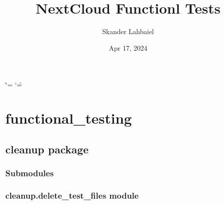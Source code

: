 \documentclass[letterpaper,10pt,english]{sphinxmanual}
\title{NextCloud Functionl Tests}
\date{Apr 17, 2024}
\author{Skander Lahbaiel}
\begin{document}
\ifdefined\shorthandoff
  \ifnum\catcode`\=\string=\active\shorthandoff{=}\fi
  \ifnum\catcode`\"=\active{}\fi
\fi

\pagestyle{empty}
\sphinxmaketitle
\pagestyle{plain}
\sphinxtableofcontents
\pagestyle{normal}
\label{\detokenize{index::doc}}


\sphinxstepscope


\chapter{functional\_testing}
\label{\detokenize{modules:functional-testing}}\label{\detokenize{modules::doc}}
\sphinxstepscope


\section{cleanup package}
\label{\detokenize{cleanup:cleanup-package}}\label{\detokenize{cleanup::doc}}

\subsection{Submodules}
\label{\detokenize{cleanup:submodules}}

\subsection{cleanup.delete\_test\_files module}
\label{\detokenize{cleanup:module-cleanup.delete_test_files}}\label{\detokenize{cleanup:cleanup-delete-test-files-module}}
\end{document}
